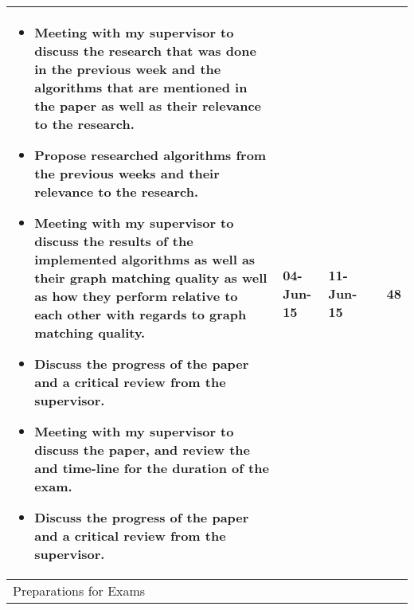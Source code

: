 \begin{longtable}{|>{\raggedleft\arraybackslash}m{50mm}|m{10mm}|m{10mm}|m{10mm}|m{30mm}|}
			\hline
				\begin{itemize}                                                                                                                                              
					\item Meeting with my supervisor to discuss the research that was done in the previous week and the algorithms that are mentioned in the paper as well as their relevance to the research.                      
					\item Propose researched algorithms from the previous weeks and their relevance to the research.                                                                                                                         
					\item Meeting with my supervisor to discuss the results of the implemented algorithms as well as their graph matching quality as well as how they perform relative to each other with regards to graph matching quality. 
					\item Discuss the progress of the paper and a critical review from the supervisor.                                                                                           
					\item Meeting with my supervisor to discuss the paper, and review the and time-line for the duration of the exam.              
					\item Discuss the progress of the paper and a critical review from the supervisor. 
				\end{itemize} & 04-Jun-15  & 11-Jun-15 &                & 48 \\
			\hline

			Preparations for Exams  &            &           &                &  \\                                                                                                                                                                                   
                                                                                                                                                                             

\end{longtable}
